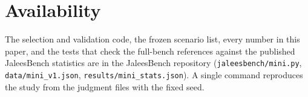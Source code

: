 \documentclass[11pt]{article}
\begin{document}
\section{Availability}\label{sec:availability}

The selection and validation code, the frozen scenario list, every number in
this paper, and the tests that check the full-bench references against the
published JaleesBench statistics are in the JaleesBench repository
(\texttt{jaleesbench/mini.py}, \texttt{data/mini\_v1.json},
\texttt{results/mini\_stats.json}). A single command reproduces the study
from the judgment files with the fixed seed.



\end{document}
